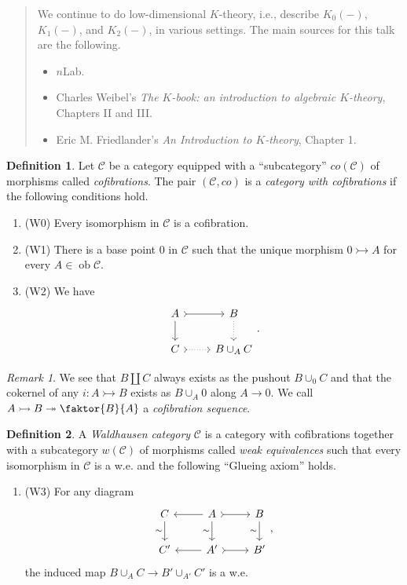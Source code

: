 \documentclass[10pt,letterpaper,cm]{nupset}
\theoremstyle{definition}
\newtheorem{definition}{Definition}
\theoremstyle{theorem}
\theoremstyle{remark}
\newtheorem{remark}{Remark}
\newcommand{\1}{\mathbf{1}}
\renewcommand{\c}{\mathscr{C}}
\newcommand{\0}{\vec 0}
\DeclareMathOperator{\ob}{ob}
\begin{document}
\begin{abstract}
We continue to do low-dimensional $K$-theory, i.e., describe $K_0(-)$, $K_1(-)$, and $K_2(-)$, in various settings. The main sources for this talk are the following.
\begin{itemize}
\item $n$Lab.
\item Charles Weibel's \textit{The $K$-book: an introduction to algebraic $K$-theory}, Chapters II and III.
\item Eric M. Friedlander's \textit{An Introduction to $K$-theory}, Chapter 1.
\end{itemize}
\end{abstract}


\begin{definition}
Let $\c$ be a category equipped with a ``subcategory'' $co(\c)$ of morphisms called \textit{cofibrations}. The pair $(\c, co)$ is a \textit{category with cofibrations} if the following conditions hold.
\begin{enumerate}
\item (W0) Every isomorphism in $\c$ is a cofibration.
\item (W1) There is a base point $0$ in $\c$ such that the unique morphism $0 \rightarrowtail A$ for every $A \in \ob \c$.
\item (W2) We have
\[
\begin{tikzcd}
A \arrow[d] \arrow[r, tail] & B \arrow[d, dotted] \\
C \arrow[r, dotted, tail] & B \cup_A C
\end{tikzcd}.
\]
\end{enumerate}
\end{definition}

\begin{remark}
We see that $B \coprod C$ always exists as the pushout $B \cup_0 C$ and that the cokernel of any $i : A \rightarrowtail B$ exists as $B \cup_A 0$ along $A \to 0$. We call $A \rightarrowtail  B \twoheadrightarrow \faktor{B}{A}$ a \textit{cofibration sequence}.
\end{remark}

\begin{definition}
A \textit{Waldhausen category} $\c$ is a category with cofibrations together with a subcategory $w(\c)$ of morphisms called \textit{weak equivalences} such that every isomorphism in $\c$ is a w.e. and the following ``Glueing axiom'' holds.
\begin{enumerate}
\item (W3) For any diagram
\[
\begin{tikzcd}
C \arrow[d, "\sim"'] & A \arrow[d, "\sim"'] \arrow[r, tail] \arrow[l] & B \arrow[d, "\sim"'] \\
C' & A' \arrow[r, tail] \arrow[l] & B'
\end{tikzcd}, \]
the induced map $B \cup_A C \to  B' \cup_{A'} C'$ is a w.e.
\end{enumerate}
\end{definition}
\end{document}
